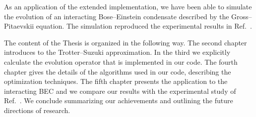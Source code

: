 As an application of the extended implementation, we have been able to simulate the evolution of an interacting Bose--Einstein condensate described by the Gross--Pitaevskii equation. The simulation reproduced the experimental results in Ref.~\citep{DSF00}.

The content of the Thesis is organized in the following way. The second chapter introduces to the Trotter--Suzuki approximation. In the third we explicitly calculate the evolution operator that is implemented in our code. The fourth chapter gives the details of the algorithms used in our code, describing the optimization techniques. The fifth chapter presents the application to the interacting BEC and we compare our results with the experimental study of Ref.~\citep{DSF00}. We conclude summarizing our achievements and outlining the future directions of research.